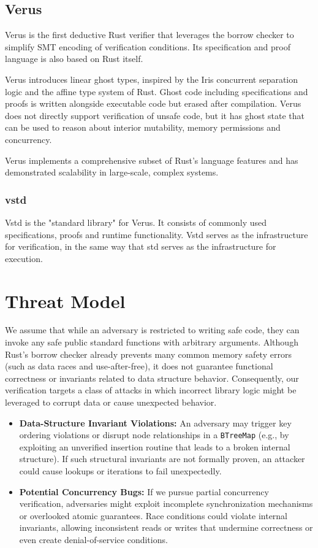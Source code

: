 \documentclass[conference]{IEEEtran}
\begin{document}
\subsection{Verus}
Verus\cite{verus} is the first deductive Rust verifier that leverages the borrow checker to simplify SMT encoding of verification conditions. Its specification and proof language is also based on Rust itself. 

Verus introduces linear ghost types, inspired by the Iris concurrent separation logic\cite{Iris_contributors_Iris} and the affine type system of Rust. Ghost code including specifications and proofs is written alongside executable code but erased after compilation. Verus does not directly support verification of unsafe code, but it has ghost state that can be used to reason about interior mutability, memory permissions and concurrency.  

Verus implements a comprehensive subset of Rust's language features and has demonstrated scalability in large-scale, complex systems\cite{verus_publications}.

\subsubsection{vstd}
Vstd is the "standard library" for Verus. It consists of commonly used specifications, proofs and runtime functionality. Vstd serves as the infrastructure for verification, in the same way that std serves as the infrastructure for execution.     

\section{Threat Model}
We assume that while an adversary is restricted to writing safe code, they can invoke any safe public standard functions with arbitrary arguments. Although Rust's borrow checker already prevents many common memory safety errors (such as data races and use-after-free), it does not guarantee functional correctness or invariants related to data structure behavior. Consequently, our verification targets a class of attacks in which incorrect library logic might be leveraged to corrupt data or cause unexpected behavior.

\begin{itemize}
\item \textbf{Data-Structure Invariant Violations:} An adversary may trigger key ordering violations or disrupt node relationships in a \texttt{BTreeMap} (e.g., by exploiting an unverified insertion routine that leads to a broken internal structure). If such structural invariants are not formally proven, an attacker could cause lookups or iterations to fail unexpectedly.
\item \textbf{Potential Concurrency Bugs:} If we pursue partial concurrency verification, adversaries might exploit incomplete synchronization mechanisms or overlooked atomic guarantees. Race conditions could violate internal invariants, allowing inconsistent reads or writes that undermine correctness or even create denial-of-service conditions.
\end{itemize}
\end{document}
